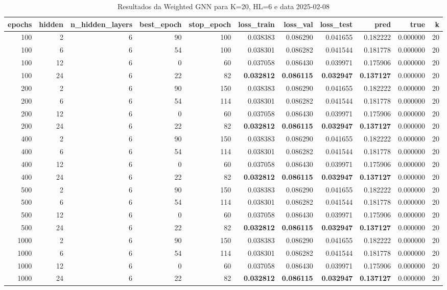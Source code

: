 \begin{table}
\caption{Resultados da Weighted GNN para K=20, HL=6 e data 2025-02-08}
\label{tab:weighted_gnn_results_k20_hl6_d20250208}
\begin{tabular}{rrrrrrrrrrr}
\toprule
epochs & hidden & n\_hidden\_layers & best\_epoch & stop\_epoch & loss\_train & loss\_val & loss\_test & pred & true & k \\
\midrule
100 & 2 & 6 & 90 & 100 & 0.038383 & 0.086290 & 0.041655 & 0.182222 & 0.000000 & 20 \\
100 & 6 & 6 & 54 & 100 & 0.038301 & 0.086282 & 0.041544 & 0.181778 & 0.000000 & 20 \\
100 & 12 & 6 & 0 & 60 & 0.037058 & 0.086430 & 0.039971 & 0.175906 & 0.000000 & 20 \\
100 & 24 & 6 & 22 & 82 & \textbf{0.032812} & \textbf{0.086115} & \textbf{0.032947} & \textbf{0.137127} & 0.000000 & 20 \\
200 & 2 & 6 & 90 & 150 & 0.038383 & 0.086290 & 0.041655 & 0.182222 & 0.000000 & 20 \\
200 & 6 & 6 & 54 & 114 & 0.038301 & 0.086282 & 0.041544 & 0.181778 & 0.000000 & 20 \\
200 & 12 & 6 & 0 & 60 & 0.037058 & 0.086430 & 0.039971 & 0.175906 & 0.000000 & 20 \\
200 & 24 & 6 & 22 & 82 & \textbf{0.032812} & \textbf{0.086115} & \textbf{0.032947} & \textbf{0.137127} & 0.000000 & 20 \\
400 & 2 & 6 & 90 & 150 & 0.038383 & 0.086290 & 0.041655 & 0.182222 & 0.000000 & 20 \\
400 & 6 & 6 & 54 & 114 & 0.038301 & 0.086282 & 0.041544 & 0.181778 & 0.000000 & 20 \\
400 & 12 & 6 & 0 & 60 & 0.037058 & 0.086430 & 0.039971 & 0.175906 & 0.000000 & 20 \\
400 & 24 & 6 & 22 & 82 & \textbf{0.032812} & \textbf{0.086115} & \textbf{0.032947} & \textbf{0.137127} & 0.000000 & 20 \\
500 & 2 & 6 & 90 & 150 & 0.038383 & 0.086290 & 0.041655 & 0.182222 & 0.000000 & 20 \\
500 & 6 & 6 & 54 & 114 & 0.038301 & 0.086282 & 0.041544 & 0.181778 & 0.000000 & 20 \\
500 & 12 & 6 & 0 & 60 & 0.037058 & 0.086430 & 0.039971 & 0.175906 & 0.000000 & 20 \\
500 & 24 & 6 & 22 & 82 & \textbf{0.032812} & \textbf{0.086115} & \textbf{0.032947} & \textbf{0.137127} & 0.000000 & 20 \\
1000 & 2 & 6 & 90 & 150 & 0.038383 & 0.086290 & 0.041655 & 0.182222 & 0.000000 & 20 \\
1000 & 6 & 6 & 54 & 114 & 0.038301 & 0.086282 & 0.041544 & 0.181778 & 0.000000 & 20 \\
1000 & 12 & 6 & 0 & 60 & 0.037058 & 0.086430 & 0.039971 & 0.175906 & 0.000000 & 20 \\
1000 & 24 & 6 & 22 & 82 & \textbf{0.032812} & \textbf{0.086115} & \textbf{0.032947} & \textbf{0.137127} & 0.000000 & 20 \\
\bottomrule
\end{tabular}
\end{table}

